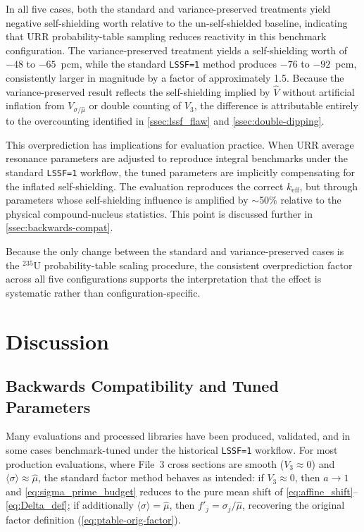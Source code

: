 \documentclass{style/nseJournal}
\newcommand{\isotope}[2]{\ensuremath{^{#1}\mathrm{#2}}}
\newcommand{\sbin}{\langle \sigma \rangle}
\begin{document}
In all five cases, both the standard and variance-preserved treatments yield negative self-shielding worth relative to the un-self-shielded baseline, indicating that URR probability-table sampling reduces reactivity in this benchmark configuration. The variance-preserved treatment yields a self-shielding worth of $-48$ to $-65$~pcm, while the standard \texttt{LSSF=1} method produces $-76$ to $-92$~pcm, consistently larger in magnitude by a factor of approximately 1.5. Because the variance-preserved result reflects the self-shielding implied by $\hat{V}$ without artificial inflation from $V_{\sigma/\hat{\mu}}$ or double counting of $V_3$, the difference is attributable entirely to the overcounting identified in \autoref{ssec:lssf_flaw} and \autoref{ssec:double-dipping}.

This overprediction has implications for evaluation practice. When URR average resonance parameters are adjusted to reproduce integral benchmarks under the standard \texttt{LSSF=1} workflow, the tuned parameters are implicitly compensating for the inflated self-shielding. The evaluation reproduces the correct $k_{\text{eff}}$, but through parameters whose self-shielding influence is amplified by $\sim$50\% relative to the physical compound-nucleus statistics. This point is discussed further in \autoref{ssec:backwards-compat}.

Because the only change between the standard and variance-preserved cases is the \isotope{235}{U} probability-table scaling procedure, the consistent overprediction factor across all five configurations supports the interpretation that the effect is systematic rather than configuration-specific.

\section{Discussion}
\label{sec:discussion}

\subsection{Backwards Compatibility and Tuned Parameters}
\label{ssec:backwards-compat}

Many evaluations and processed libraries have been produced, validated, and in some cases benchmark-tuned under the historical \texttt{LSSF=1} workflow. For most production evaluations, where File~3 cross sections are smooth ($V_3 \approx 0$) and $\sbin \approx \hat{\mu}$, the standard factor method behaves as intended: if $V_3 \approx 0$, then $a \to 1$ and \autoref{eq:sigma_prime_budget} reduces to the pure mean shift of \autoref{eq:affine_shift}--\autoref{eq:Delta_def}; if additionally $\sbin = \hat{\mu}$, then $f'_j = \sigma_j / \hat{\mu}$, recovering the original factor definition (\autoref{eq:ptable-orig-factor}).
\end{document}
